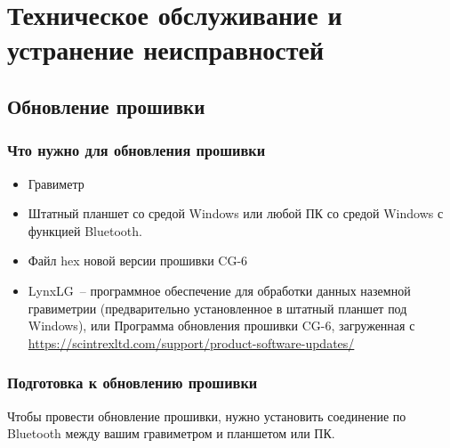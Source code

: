 \chapter[Техническое обслуживание]{Техническое обслуживание и устранение неисправностей}
\label{chap:maintenance_and_troubleshooting}

\section{Обновление прошивки}


\subsection{Что нужно для обновления прошивки}

\begin{itemize}
  \item Гравиметр \cg{}

  \item Штатный планшет со средой Windows или любой ПК со средой Windows с
    функцией Bluetooth.

  \item Файл hex новой версии прошивки CG-6

  \item LynxLG~-- программное обеспечение для обработки данных наземной
    гравиметрии (предварительно установленное в штатный планшет под Windows),
    или Программа обновления прошивки CG-6,
    загруженная с
    \url{https://scintrexltd.com/support/product-software-updates/}
\end{itemize}

\subsection{Подготовка к обновлению прошивки}
\label{subsec:preparing_to_upgrade_your_firmware}

Чтобы провести обновление прошивки, нужно установить
соединение по Bluetooth между вашим гравиметром \cg{} и планшетом или ПК.



